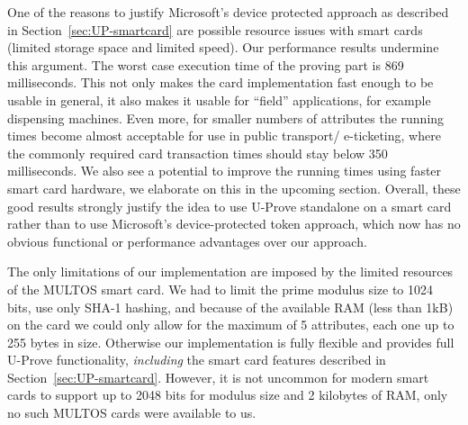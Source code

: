One of the reasons to justify Microsoft's device protected approach as
described in Section~\ref{sec:UP-smartcard} are possible resource issues with
smart cards (limited storage space and limited speed). Our performance results
undermine this argument. The worst case execution time of the proving part is
869 milliseconds. This not only makes the card implementation fast enough to be
usable in general, it also makes it usable for ``field'' applications, for
example dispensing machines. Even more, for smaller numbers of attributes the
running times become almost acceptable for use in public transport\slash
e-ticketing, where the commonly required card transaction times should stay
below 350 milliseconds. We also see a potential to improve the running times
using faster smart card hardware, we elaborate on this in the upcoming section.
Overall, these good results strongly justify the idea to use U-Prove standalone
on a smart card rather than to use Microsoft's device-protected token approach,
which now has no obvious functional or performance advantages over our approach.

The only limitations of our implementation are imposed by the limited resources
of the MULTOS smart card. We had to limit the prime modulus size to 1024 bits,
use only SHA-1 hashing, and because of the available RAM (less than 1kB) on the
card we could only allow for the maximum of 5 attributes, each one up to 255
bytes in size. Otherwise our implementation is fully flexible and provides full
U-Prove functionality, \emph{including} the smart card features described in
Section~\ref{sec:UP-smartcard}. However, it is not uncommon for modern smart
cards to support up to 2048 bits for modulus size and 2 kilobytes of RAM, only
no such MULTOS cards were available to us.
